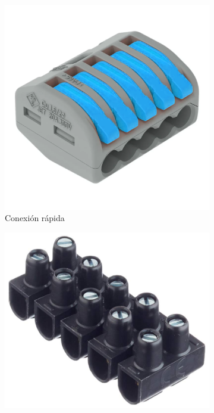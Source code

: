 \begin{figure}[H]
    \centering
    \begin{subfigure}[b]{0.25\textwidth}
        \includegraphics[width=\textwidth]{images/2-hardware/wago.png}       
        \caption{Conexión rápida}
    \end{subfigure}
    \hspace{2cm}
    \begin{subfigure}[b]{0.25\textwidth}
        \includegraphics[width=\textwidth]{images/2-hardware/regletas.png}

\end{subfigure}
\end{figure}

